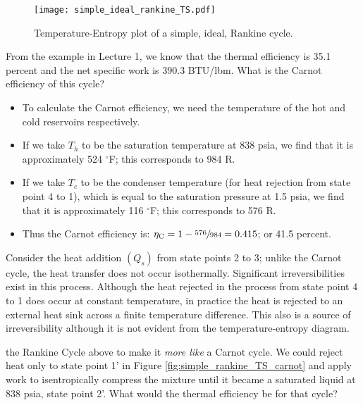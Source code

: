 \begin{figure}
\texttt{[image: simple\_ideal\_rankine\_TS.pdf]}
\caption{Temperature-Entropy plot of a simple, ideal, Rankine cycle.}
\label{fig:simple_rankine_TS_2}
\end{figure} 

From the example in Lecture 1, we know that the thermal efficiency is 35.1 percent and the net specific work is 390.3 BTU/lbm.  What is the Carnot efficiency of this cycle?
\begin{itemize}
\item To calculate the Carnot efficiency, we need the temperature of the hot and cold reservoirs respectively.
\item If we take $T_h$ to be the saturation temperature at 838 psia, we find that it is approximately 524 $^{\circ}$F; this corresponds to 984 R. 
\item If we take $T_c$ to be the condenser temperature (for heat rejection from state point 4 to 1), which is equal to the saturation pressure at 1.5 psia, we find that it is approximately 116 $^{\circ}$F; this corresponds to 576 R.
\item Thus the Carnot efficiency is: $\eta_{\text{C}} = 1 - \sfrac{576}{984} = 0.415$; or 41.5 percent.  
\end{itemize}

Consider the heat addition $(Q_s)$ from state points 2 to 3; unlike the Carnot cycle, the heat transfer does not occur isothermally.  Significant irreversibilities exist in this process.  Although the heat rejected in the process from state point 4 to 1 does occur at constant temperature, in practice the heat is rejected to an external heat sink across a finite temperature difference. This also is a source of irreversibility although it is not evident from the temperature-entropy diagram.  

 the Rankine Cycle above to make it \emph{more like} a Carnot cycle.  We could reject heat only to state point 1' in Figure \ref{fig:simple_rankine_TS_carnot} and apply work to isentropically compress the mixture until it became a saturated liquid at 838 psia, state point 2'.  What would the thermal efficiency be for that cycle?

